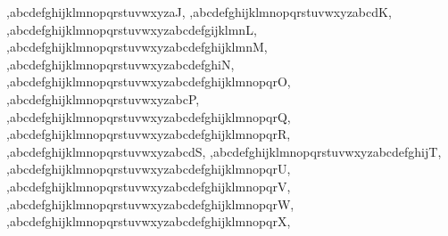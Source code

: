 {{\QRdataadd,abcdefghijklmnopqrstuvwxyzaJ,%
\QRdataadd,abcdefghijklmnopqrstuvwxyzabcdK,%
\QRdataadd,abcdefghijklmnopqrstuvwxyzabcdefgijklmnL,%
\QRdataadd,abcdefghijklmnopqrstuvwxyzabcdefghijklmnM,%
\QRdataadd,abcdefghijklmnopqrstuvwxyzabcdefghiN,%
\QRdataadd,abcdefghijklmnopqrstuvwxyzabcdefghijklmnopqrO,%
\QRdataadd,abcdefghijklmnopqrstuvwxyzabcP,%
\QRdataadd,abcdefghijklmnopqrstuvwxyzabcdefghijklmnopqrQ,%
\QRdataadd,abcdefghijklmnopqrstuvwxyzabcdefghijklmnopqrR,%
\QRdataadd,abcdefghijklmnopqrstuvwxyzabcdS,%
\QRdataadd,abcdefghijklmnopqrstuvwxyzabcdefghijT,%
\QRdataadd,abcdefghijklmnopqrstuvwxyzabcdefghijklmnopqrU,%
\QRdataadd,abcdefghijklmnopqrstuvwxyzabcdefghijklmnopqrV,%
\QRdataadd,abcdefghijklmnopqrstuvwxyzabcdefghijklmnopqrW,%
\QRdataadd,abcdefghijklmnopqrstuvwxyzabcdefghijklmnopqrX,%
}}
